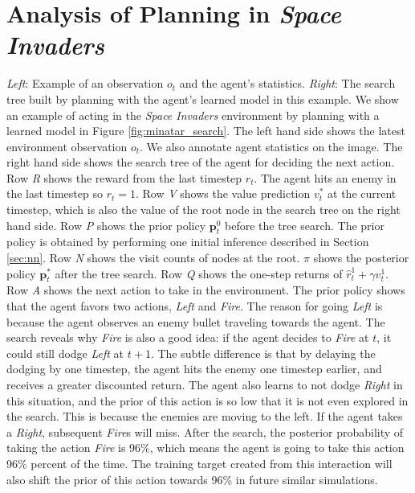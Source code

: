 \FloatBarrier

\section{Analysis of Planning in \textit{Space Invaders}} \label{sec:exp:plan_space_invaders}

{
    \textit{Left}: Example of an observation \(o_t\) and the agent's statistics.
    \textit{Right}: The search tree built by planning with the agent's learned model in this example.
}
We show an example of \moozi acting in the \textit{Space Invaders} environment by planning with a learned model in Figure \ref{fig:minatar_search}.
The left hand side shows the latest environment observation $o_t$.
We also annotate agent statistics on the image.
The right hand side shows the search tree of the agent for deciding the next action.
Row \textit{R} shows the reward from the last timestep $r_t$.
The agent hits an enemy in the last timestep so $r_t = 1$.
Row \textit{V} shows the value prediction $v_t^{*}$ at the current timestep, which is also the value of the root node in the search tree on the right hand side.
Row \textit{P} shows the prior policy $\mathbf{p}^0_t$ before the tree search.
The prior policy is obtained by performing one initial inference described in Section \ref{sec:nn}.
Row \textit{N} shows the visit counts of nodes at the root.
\(\pi\) shows the posterior policy $\mathbf{p}^*_t$ after the tree search.
Row \textit{Q} shows the one-step returns of  \(\hat{r}_t^1 + \gamma v_t^1\).
Row \textit{A} shows the next action to take in the environment.
The prior policy shows that the agent favors two actions, \textit{Left} and \textit{Fire}.
The reason for going \textit{Left} is because the agent observes an enemy bullet traveling towards the agent.
The search reveals why \textit{Fire} is also a good idea: if the agent decides to \textit{Fire} at $t$, it could still dodge \textit{Left} at $t+1$.
The subtle difference is that by delaying the dodging by one timestep, the agent hits the enemy one timestep earlier, and receives a greater discounted return.
The agent also learns to not dodge \textit{Right} in this situation, and the prior of this action is so low that it is not even explored in the search.
This is because the enemies are moving to the left.
If the agent takes a \textit{Right}, subsequent \textit{Fire}s will miss.
After the search, the posterior probability of taking the action \textit{Fire} is 96\%, which means the agent is going to take this action 96\% percent of the time.
The training target created from this interaction will also shift the prior of this action towards 96\% in future similar simulations.


